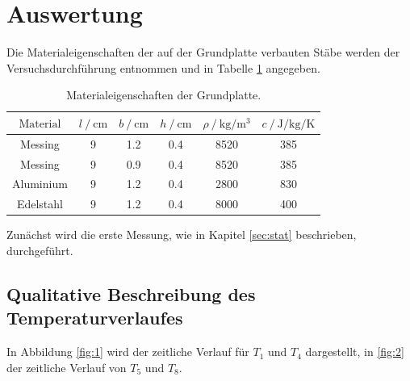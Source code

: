 \section{Auswertung}
\label{sec:Auswertung}

Die Materialeigenschaften der auf der Grundplatte verbauten Stäbe werden der Versuchsdurchführung entnommen und in Tabelle \ref{tab:1} angegeben.

\begin{table}
  \centering
  \caption{Materialeigenschaften der Grundplatte. \cite{sample}}
  \label{tab:1}
  \begin{tabular}{c c c c c c}
    \toprule
    {$\text{Material}$} & {$l \:/\: \si{\centi\metre}$} & {$b \:/\: \si{\centi\metre}$} & {$h \:/\: \si{\centi\metre}$} & {$\rho \:/\: \si{\kilo\gram\per\metre\tothe{3}}$} & {$c \:/\: \si{\joule\per\kilo\gram\per\kelvin} $} \\
    \midrule
    Messing  & 9 & 1.2 & 0.4 & 8520 & 385 \\
    Messing  & 9 & 0.9 & 0.4 & 8520 & 385 \\
    Aluminium  & 9 & 1.2 & 0.4 & 2800 & 830 \\
    Edelstahl  & 9 & 1.2 & 0.4 & 8000 & 400 \\

    \bottomrule
  \end{tabular}
\end{table}

Zunächst wird die erste Messung, wie in Kapitel \ref{sec:stat} beschrieben, durchgeführt.


\subsection{Qualitative Beschreibung des Temperaturverlaufes}


In Abbildung \ref{fig:1} wird der zeitliche Verlauf für $T_1$ und $T_4$ dargestellt, in \ref{fig:2} der zeitliche Verlauf von $T_5$ und $T_8$.

